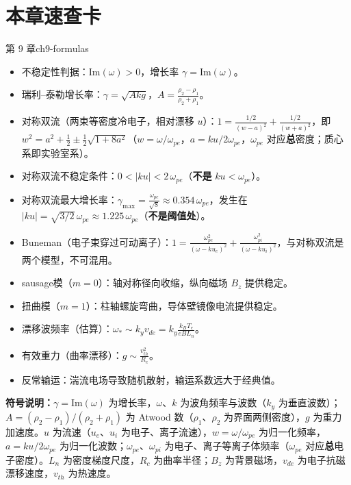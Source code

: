 \section*{本章速查卡}
{}
\begin{formulabox}{第 9 章}{ch9-formulas}
\begin{itemize}[leftmargin=*,itemsep=0pt]
\item 不稳定性判据：$\text{Im}(\omega) > 0$，增长率 $\gamma = \text{Im}(\omega)$。
\item 瑞利--泰勒增长率：$\displaystyle\gamma = \sqrt{A k g}$，$A = \frac{\rho_2 - \rho_1}{\rho_2 + \rho_1}$。
\item 对称双流（两束等密度冷电子，相对漂移 $u$）：$\displaystyle 1=\frac{1/2}{(w-a)^2}+\frac{1/2}{(w+a)^2}$，即 $\displaystyle w^2=a^2+\frac12\pm\frac12\sqrt{1+8a^2}$（$w=\omega/\omega_{pe}$，$a=ku/2\omega_{pe}$，$\omega_{pe}$ 对应\textbf{总}密度；质心系即实验室系）。
\item 对称双流不稳定条件：$\displaystyle 0<|ku|<2\,\omega_{pe}$（\textbf{不是} $ku<\omega_{pe}$）。
\item 对称双流最大增长率：$\displaystyle\gamma_{\max}=\frac{\omega_{pe}}{\sqrt8}\approx0.354\,\omega_{pe}$，发生在 $\displaystyle|ku|=\sqrt{3/2}\,\omega_{pe}\approx1.225\,\omega_{pe}$（\textbf{不是阈值处}）。
\item Buneman（电子束穿过可动离子）：$\displaystyle 1=\frac{\omega_{pe}^2}{(\omega-ku_e)^2}+\frac{\omega_{pi}^2}{(\omega-ku_i)^2}$，与对称双流是两个模型，不可混用。
\item  sausage模（$m=0$）：轴对称径向收缩，纵向磁场 $B_z$ 提供稳定。
\item 扭曲模（$m=1$）：柱轴螺旋弯曲，导体壁镜像电流提供稳定。
\item 漂移波频率（估算）：$\displaystyle\omega_* \sim k_y v_{de} = k_y \frac{k_{\!B}T_e}{eBL_n}$。
\item 有效重力（曲率漂移）：$\displaystyle g \sim \frac{v_{th}^2}{R_c}$。
\item 反常输运：湍流电场导致随机散射，输运系数远大于经典值。
\end{itemize}
\textbf{符号说明：}$\gamma=\text{Im}(\omega)$ 为增长率，$\omega$、$k$ 为波角频率与波数（$k_y$ 为垂直波数）；$A=(\rho_2-\rho_1)/(\rho_2+\rho_1)$ 为 Atwood 数（$\rho_1$、$\rho_2$ 为界面两侧密度），$g$ 为重力加速度。$u$ 为流速（$u_e$、$u_i$ 为电子、离子流速），$w=\omega/\omega_{pe}$ 为归一化频率，$a=ku/2\omega_{pe}$ 为归一化波数；$\omega_{pe}$、$\omega_{pi}$ 为电子、离子等离子体频率（$\omega_{pe}$ 对应\textbf{总}电子密度）。$L_n$ 为密度梯度尺度，$R_c$ 为曲率半径；$B_z$ 为背景磁场，$v_{de}$ 为电子抗磁漂移速度，$v_{th}$ 为热速度。
\end{formulabox}

